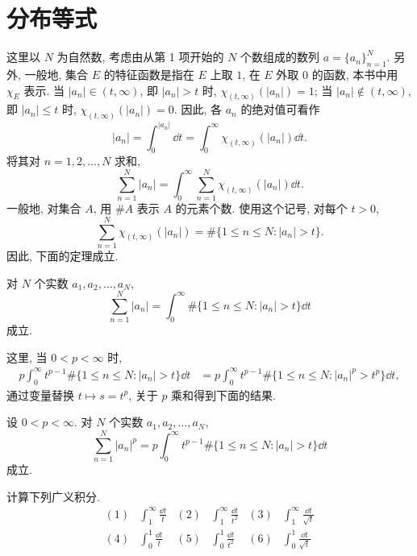 \section{分布等式}\label{sec:1.2}







这里以 $N$ 为自然数, 考虑由从第 1 项开始的 $N$ 个数组成的数列 $a = \{a_n\}_{n=1}^{N}$. 另外, 一般地, 集合 $E$ 的特征函数是指在 $E$ 上取 $1$, 在 $E$ 外取 $0$ 的函数, 本书中用 $\chi_E$ 表示. 当 $|a_n| \in (t, \infty)$, 即 $|a_n| > t$ 时, $\chi_{(t,\infty)}(|a_n|) = 1$; 当 $|a_n| \notin (t, \infty)$, 即 $|a_n| \leq t$ 时, $\chi_{(t,\infty)}(|a_n|) = 0$. 因此, 各 $a_n$ 的绝对值可看作
\[
|a_n| = \int_{0}^{|a_n|} \dd t = \int_{0}^{\infty} \chi_{(t,\infty)}(|a_n|) \dd t.
\]
将其对 $n = 1, 2, \ldots, N$ 求和,
\[
\sum_{n=1}^{N} |a_n| = \int_{0}^{\infty} \sum_{n=1}^{N} \chi_{(t,\infty)}(|a_n|) \dd t.
\]
一般地, 对集合 $A$, 用 $\#A$ 表示 $A$ 的元素个数. 使用这个记号, 对每个 $t > 0$,
\[
\sum_{n=1}^{N} \chi_{(t,\infty)}(|a_n|) = \# \{1 \leq n \leq N : |a_n| > t\}.
\]
因此, 下面的定理成立.

\begin{theorem}\label{thm:1.3}
对 $N$ 个实数 $a_{1}, a_{2}, \ldots, a_{N}$,
\[
\sum_{n=1}^{N} |a_n| = \int_{0}^{\infty} \# \{1 \leq n \leq N : |a_n| > t\} \dd t
\]
成立.
\end{theorem}

这里, 当 $0 < p < \infty$ 时,
\begin{align*}
p \int_{0}^{\infty} t^{p-1} \# \{1 \leq n \leq N : |a_n| > t\} \dd t & = p \int_{0}^{\infty} t^{p-1} \# \{1 \leq n \leq N : |a_n|^{p} > t^{p}\} \dd t,
\end{align*}
通过变量替换 $t \mapsto s = t^{p}$, 关于 $p$ 乘和得到下面的结果.

\begin{theorem}\label{thm:1.4}
设 $0 < p < \infty$. 对 $N$ 个实数 $a_{1}, a_{2}, \ldots, a_{N}$,
\[
\sum_{n=1}^{N} |a_n|^{p} = p \int_{0}^{\infty} t^{p-1} \# \{1 \leq n \leq N : |a_n| > t\} \dd t
\]
成立.
\end{theorem}

\begin{exercise}\label{exer:1.7}
计算下列广义积分.
\begin{align*}
(1) & \int_{1}^{\infty} \frac{\dd t}{t} & (2) & \int_{1}^{\infty} \frac{\dd t}{t^{2}} & (3) & \int_{1}^{\infty} \frac{\dd t}{\sqrt{t}} \\
(4) & \int_{0}^{1} \frac{\dd t}{t} & (5) & \int_{0}^{1} \frac{\dd t}{t^{2}} & (6) & \int_{0}^{1} \frac{\dd t}{\sqrt{t}}
\end{align*}
\end{exercise}

